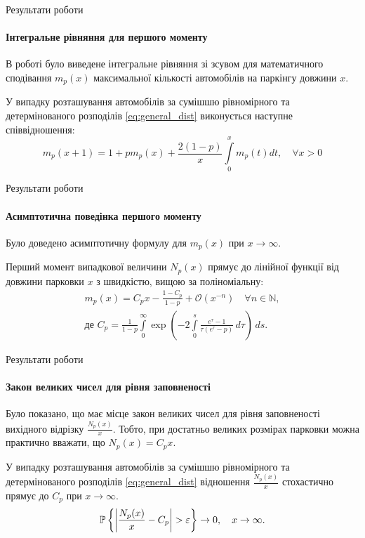 \begin{frame}{Результати роботи}
	\framesubtitle{Інтегральне рівняння для першого моменту}
	В роботі було виведене інтегральне рівняння зі зсувом для математичного сподівання $m_{p}(x)$ максимальної кількості автомобілів на паркінгу довжини $x$.
	\begin{thm}
		У випадку розташування автомобілів за сумішшю рівномірного та детермінованого розподілів \eqref{eq:general_dist} виконується наступне співвідношення:
        \begin{equation}
		m_{p}(x + 1) = 1 + p m_{p}(x) + \frac{2(1-p)}{x} \int\limits_0^{x} m_{p}(t) dt,\quad \forall x > 0
        \end{equation}
	\end{thm}
\end{frame}

\begin{frame}{Результати роботи}
	\framesubtitle{Асимптотична поведінка першого моменту}
	Було доведено асимптотичну формулу для $m_{p}(x)$ при $x \rightarrow \infty$.
	\begin{thm}
		Перший момент випадкової величини $N_{p}(x)$ прямує до лінійної функції від довжини парковки $x$ з швидкістю, вищою за поліноміальну:
		\begin{gather}
		m_{p}(x) = C_{p} x - \frac{1 - C_{p}}{1-p} + \mathcal{O}(x^{-n}) \quad \forall n \in \mathbb{N}, \\
		\text{де }C_{p} = \frac{1}{1-p}  \int\limits_0^\infty \exp\left( -2\int\limits_0^s \frac{e^{\tau} - 1}{\tau(e^\tau - p)}\,d\tau\right)\,ds \label{eq:c_p_integral}.
		\end{gather}
	\end{thm}
\end{frame}

\begin{frame}{Результати роботи}
\framesubtitle{Закон великих чисел для рівня заповненості}
Було показано, що має місце закон великих чисел для рівня заповненості вихідного відрізку $\frac{N_{p}(x)}{x}$. Тобто, при достатньо великих розмірах парковки можна практично вважати, що $N_{p}(x)=C_{p}x$.
\begin{thm}
	У випадку розташування автомобілів за сумішшю рівномірного та детермінованого розподілів \eqref{eq:general_dist} відношення $\frac{N_{p}(x)}{x}$ стохастично прямує до $C_{p}$ при $x \rightarrow \infty$.
	\begin{equation}
	\operatorname{\mathbb{P}}\left\{\left|\frac{N_{p}(x)}{x} - C_{p}\right| > \varepsilon\right\} \rightarrow 0, \quad x \rightarrow \infty.
	\end{equation}
\end{thm}
\note{}
\end{frame}


